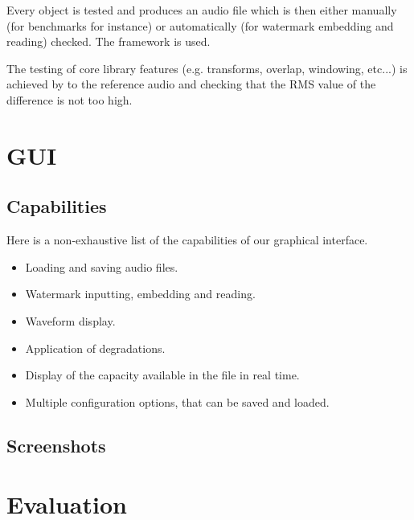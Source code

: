 Every object is tested and produces an audio file which is then either manually (for benchmarks for instance) or automatically (for watermark embedding and reading) checked. The  framework is used.

The testing of core library features (e.g. transforms, overlap, windowing, etc...) is achieved by  to the reference audio and checking that the RMS value of the difference is not too high.
\section{GUI}
\subsection{Capabilities}
Here is a non-exhaustive list of the capabilities of our graphical interface.
\begin{itemize}
\item Loading and saving audio files.
\item Watermark inputting, embedding and reading.
\item Waveform display.
\item Application of degradations.
\item Display of the capacity available in the file in real time.
\item Multiple configuration options, that can be saved and loaded.
\end{itemize}
\subsection{Screenshots}
\section{Evaluation}